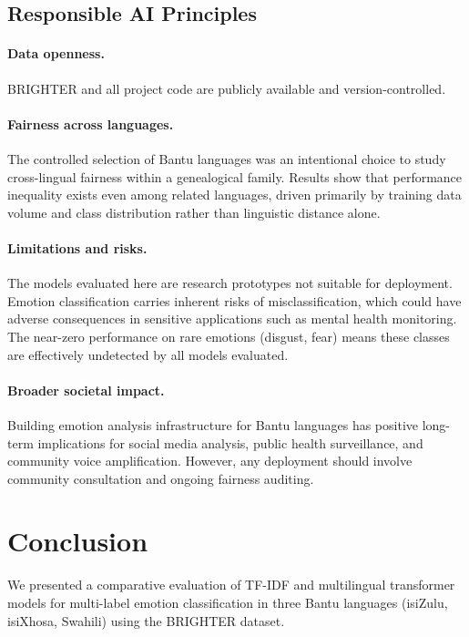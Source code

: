 \documentclass[11pt]{article}
\begin{document}
\subsection{Responsible AI Principles}

\paragraph{Data openness.}
BRIGHTER and all project code are publicly available and version-controlled.

\paragraph{Fairness across languages.}
The controlled selection of Bantu languages was an intentional choice to study
cross-lingual fairness within a genealogical family.
Results show that performance inequality exists even among related languages,
driven primarily by training data volume and class distribution rather than
linguistic distance alone.

\paragraph{Limitations and risks.}
The models evaluated here are research prototypes not suitable for deployment.
Emotion classification carries inherent risks of misclassification, which
could have adverse consequences in sensitive applications such as mental health
monitoring.
The near-zero performance on rare emotions (disgust, fear) means these classes
are effectively undetected by all models evaluated.

\paragraph{Broader societal impact.}
Building emotion analysis infrastructure for Bantu languages has positive
long-term implications for social media analysis, public health surveillance,
and community voice amplification.
However, any deployment should involve community consultation and ongoing
fairness auditing.

\section{Conclusion}

We presented a comparative evaluation of TF-IDF and multilingual transformer
models for multi-label emotion classification in three Bantu languages
(isiZulu, isiXhosa, Swahili) using the BRIGHTER dataset.
\end{document}
